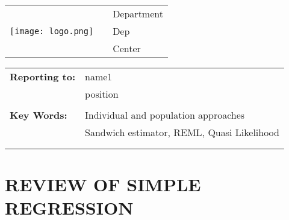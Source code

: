 \documentclass[letterpaper,11pt]{article}
\begin{document}


\vspace{-25pt}%

\begin{tabular}[t]{lp{1in}l}
	\multirow{5}{*}{\texttt{[image: logo.png]}} && Department \leavevmode  \\
																								&& Dep \\
																								&& Center\\
\end{tabular}


\leavevmode \newline \vspace{15pt} \newline\vspace{0.015in}

\begin{tabular}[h!]{p{2in} p{10in}}
	\rule{0pt}{4ex}\textbf{Reporting to:}          & name1  \\
																							   & position \\
                                                 & \\
	\rule{0pt}{4ex}\textbf{Key Words:}  					 & Individual and population approaches\\
																								 & Sandwich estimator, REML, Quasi Likelihood \\
 \mbox{$\quad$} \\
 \mbox{$\quad$} \\
\end{tabular}

\newpage
\noindent 


\section*{REVIEW OF SIMPLE REGRESSION}
\end{document}
